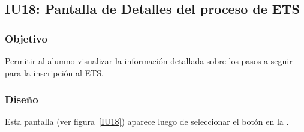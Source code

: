 \subsection{IU18: Pantalla de Detalles del proceso de ETS}

\label{IU18}
\newpage

\subsubsection{Objetivo}
Permitir al alumno visualizar la información detallada sobre los pasos a seguir para la inscripción al ETS.

\subsubsection{Diseño}
Esta pantalla  (ver figura~\ref{IU18}) aparece luego de seleccionar el botón  en la .

